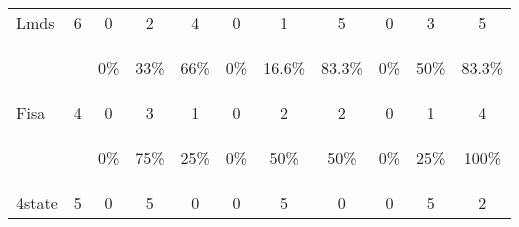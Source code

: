 \documentclass[a4paper,20pt,notitlepage,openbib]{article}
\begin{document}
\begin{table}[htbp]
\begin{center}
\begin{tabular}{| l | c | c c c | c c c | c c c |}
\hline
Lmds    &  6   & 0 &2& 4                                   & 0 &1& 5                              & 0& 3& 5                             \\
        &     & \begin{small}0\%\end{small} &\begin{small}33\%\end{small} &\begin{small}66\%\end{small} & \begin{small}0\%\end{small} &\begin{small}16.6\%\end{small} &\begin{small}83.3\%\end{small} & \begin{small}0\%\end{small} &\begin{small}50\%\end{small} &\begin{small}83.3\%\end{small} \\
\hline
Fisa    &  4   & 0 & 3 & 1                                   & 0 & 2 & 2                              & 0  &1 & 4                             \\
        &     & \begin{small}0\%\end{small} & \begin{small}75\%\end{small} & \begin{small}25\%\end{small} & \begin{small}0\%\end{small} & \begin{small}50\% \end{small}& \begin{small}50\%\end{small} & \begin{small}0\%\end{small}  &\begin{small}25\%\end{small}  &\begin{small}100\%\end{small} \\
\hline
4state   &  5   & 0 & 5  &0                                   & 0 & 5 & 0                              & 0 & 5 & 2                             \\

\end{tabular}
\end{center}
\end{table}
\end{document}
